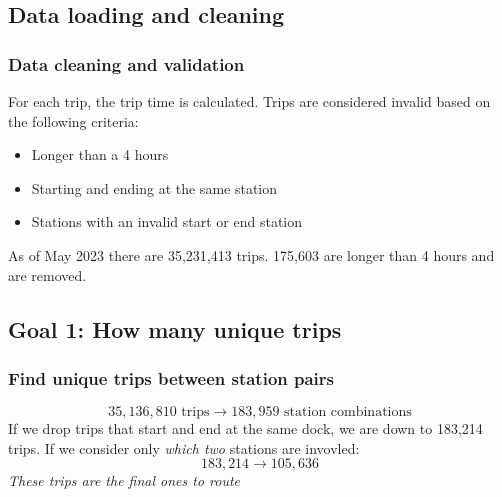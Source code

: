 \documentclass[aspectratio=169]{beamer}
\begin{document}
\subsection{Data loading and cleaning}
\begin{frame}
    \frametitle{Data cleaning and validation}
    For each trip, the trip time is calculated.
    Trips are considered invalid based on the following criteria:
    \begin{itemize}
        \item Longer than a 4 hours


        \item Starting and ending at the same station


        \item Stations with an invalid start or end station

    \end{itemize}
    As of May 2023 there are 35,231,413 trips. 175,603 are longer than 4 hours and are removed.
\end{frame}
\subsection{Goal 1: How many unique trips}
\begin{frame}
    \frametitle{Find unique trips between station pairs}
    $$ 35,136,810 \text{ trips} \rightarrow 183,959 \text{ station combinations} $$
    If we drop trips that start and end at the same dock, we are down to 183,214 trips.
    \smallskip
    If we consider only \emph{which two} stations are invovled:
    $$ 183,214 \rightarrow 105,636 $$
    \emph{These trips are the final ones to route}
\end{frame}
\end{document}
